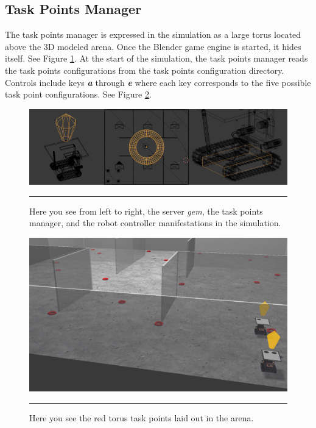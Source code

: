 \subsection{Task Points Manager}


The task points manager is expressed in the simulation as a large torus located above the 3D modeled arena. Once the Blender game engine is started, it hides itself. See Figure \ref{fig:blendersim_components}. At the start of the simulation, the task points manager reads the task points configurations from the task points configuration directory. Controls include keys \textit{\textbf{a}} through \textit{\textbf{e}} where each key corresponds to the five possible task point configurations. See Figure \ref{fig:task_points}. 

\begin{figure}[htbp]
\centering
\includegraphics[scale=0.4]{../Figures/Chapter5/parts.png}
\rule{35em}{0.5pt}
\caption[BlenderSim Components]{Here you see from left to right, the server \textit{gem}, the task points manager, and the robot controller manifestations in the simulation.}
\label{fig:blendersim_components}
\end{figure}

\begin{figure}[htbp]
\centering
\includegraphics[scale=0.32]{../Figures/Chapter5/taskPoints.png}
\rule{35em}{0.5pt}
\caption[Task Points]{Here you see the red torus task points laid out in the arena.}
\label{fig:task_points}
\end{figure}

